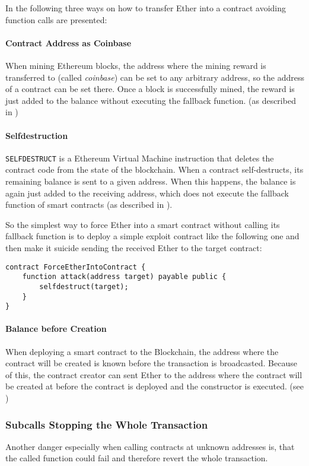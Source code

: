 In the following three ways on how to transfer Ether into a contract avoiding function calls are presented:

\paragraph{Contract Address as Coinbase}
When mining Ethereum blocks, the address where the mining reward is transferred to (called \textit{coinbase}) can be set to any arbitrary address, so the address of a contract can be set there. Once a block is successfully mined, the reward is just added to the balance without executing the fallback function. (as described in \cite[Security Considerations; Sending and Receiving Ether]{ethereum:solidity})

\paragraph{Selfdestruction}
\texttt{SELFDESTRUCT} is a Ethereum Virtual Machine instruction that deletes the contract code from the state of the blockchain. When a contract self-destructs, its remaining balance is sent to a given address. When this happens, the balance is again just added to the receiving address, which does not execute the fallback function of smart contracts (as described in \cite[Security Considerations; Sending and Receiving Ether]{ethereum:solidity}).

So the simplest way to force Ether into a smart contract without calling its fallback function is to deploy a simple exploit contract like the following one and then make it suicide sending the received Ether to the target contract:
\begin{verbatim}
contract ForceEtherIntoContract {
    function attack(address target) payable public {
        selfdestruct(target);
    }
}
\end{verbatim}

\paragraph{Balance before Creation}
When deploying a smart contract to the Blockchain, the address where the contract will be created is known before the transaction is broadcasted. Because of this, the contract creator can sent Ether to the address where the contract will be created at before the contract is deployed and the constructor is executed. (see \cite{uscc:secondplace})

\subsubsection{Subcalls Stopping the Whole Transaction}
Another danger especially when calling contracts at unknown addresses is, that the called function could fail and therefore revert the whole transaction.

